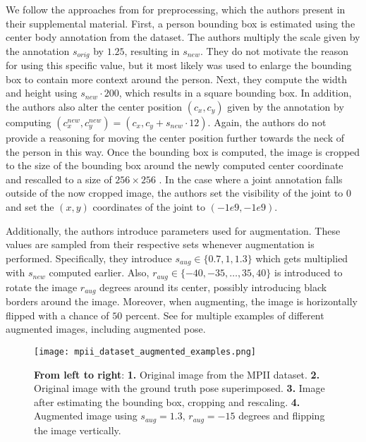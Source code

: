 We follow the approaches from \cite{luvizon_2d/3d_2018} for preprocessing, which the authors present in their supplemental material.
First, a person bounding box is estimated using the center body annotation from the dataset.
The authors multiply the scale given by the annotation $s_{orig}$ by $1.25$, resulting in $s_{new}$.
They do not motivate the reason for using this specific value, but it most likely was used to enlarge the bounding box to contain more context around the person.
Next, they compute the width and height using $s_{new} \cdot 200$, which results in a square bounding box.
In addition, the authors also alter the center position $(c_x,  c_y)$ given by the annotation by computing $(c_{x}^{new}, c_y^{new}) = (c_x, c_y + s_{new} \cdot 12)$.
Again, the authors do not provide a reasoning for moving the center position further towards the neck of the person in this way.
Once the bounding box is computed, the image is cropped to the size of the bounding box around the newly computed center coordinate and rescalled to a size of $256 \times 256$ .
In the case where a joint annotation falls outside of the now cropped image, the authors set the visibility of the joint to $0$ and set the $(x,y)$ coordinates of the joint to $(-1e9, -1e9)$.

Additionally, the authors introduce parameters used for augmentation.
These values are sampled from their respective sets whenever augmentation is performed.
Specifically, they introduce $s_{aug} \in \{0.7, 1, 1.3\}$ which gets multiplied with $s_{new}$ computed earlier.
Also, $r_{aug} \in \{-40, -35, \dots, 35, 40\}$ is introduced to rotate the image $r_{aug}$ degrees around its center, possibly introducing black borders around the image.
Moreover, when augmenting, the image is horizontally flipped with a chance of $50$ percent.
See  for multiple examples of different augmented images, including augmented pose. 

\begin{figure}[htb!]
    \centering
    \texttt{[image: mpii\_dataset\_augmented\_examples.png]}
    \caption{\textbf{From left to right}: \textbf{1.} Original image from the MPII dataset. \textbf{2.} Original image with the ground truth pose superimposed. \textbf{3.} Image after estimating the bounding box, cropping and rescaling. \textbf{4.} Augmented image using $s_{aug} = 1.3$, $r_{aug} = -15$ degrees and flipping the image vertically.}
    \label{fig:mpii_example_augmentation}
\end{figure}


